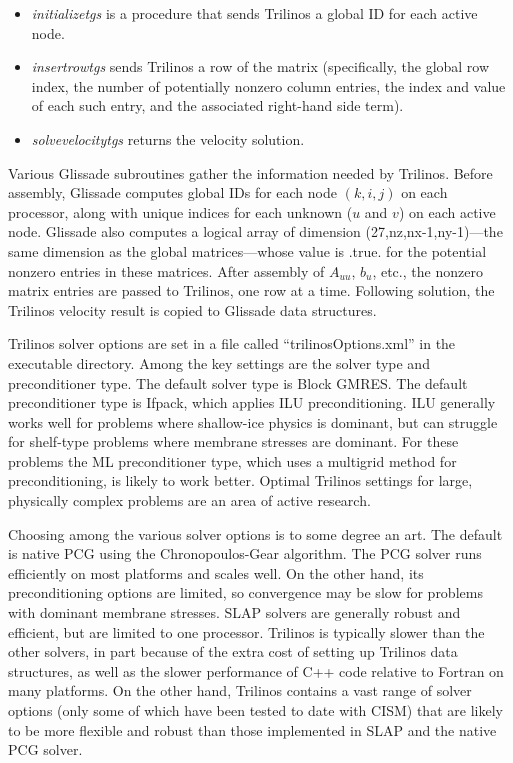 \begin{itemize}
\item \textit{initializetgs} is a procedure that sends Trilinos a global ID for each active node.
\item \textit{insertrowtgs} sends Trilinos a row of the matrix (specifically, the global row index, the number of
potentially nonzero column entries, the index and value of each such entry, and the associated right-hand side term).
\item \textit{solvevelocitytgs} returns the velocity solution.
\end{itemize}

Various Glissade subroutines gather the information needed by Trilinos.  Before assembly, Glissade computes
global IDs for each node $(k,i,j)$ on each processor, along with unique indices for each unknown ($u$ and $v$)
on each active node.  Glissade also computes a logical array of dimension (27,nz,nx-1,ny-1)---the same dimension
as the global matrices---whose value is .true. for the potential nonzero entries in these matrices.
After assembly of $A_{uu}$, $b_u$, etc., the nonzero matrix entries are passed to Trilinos, one row at a time.
Following solution, the Trilinos velocity result is copied to Glissade data structures.

Trilinos solver options are set in a file called ``trilinosOptions.xml'' in the executable directory.
Among the key settings are the solver type and preconditioner type.  The default solver type is Block GMRES.
The default preconditioner type is Ifpack, which applies ILU preconditioning.  ILU generally works well
for problems where shallow-ice physics is dominant, but can struggle for shelf-type problems where
membrane stresses are dominant.  For these problems the ML preconditioner type, which uses a multigrid
method for preconditioning, is likely to work better.  Optimal Trilinos settings for large, physically complex
problems are an area of active research.

Choosing among the various solver options is to some degree an art.  The default is native PCG using
the Chronopoulos-Gear algorithm.  The PCG solver runs efficiently on most platforms and scales well.
On the other hand, its preconditioning options are limited, so convergence may be slow for problems
with dominant membrane stresses.  SLAP solvers are generally robust and efficient, but are limited
to one processor.  Trilinos is typically slower than the other solvers, in part because of the
extra cost of setting up Trilinos data structures, as well as the slower performance of C++ code
relative to Fortran on many platforms.  On the other hand, Trilinos contains a vast range of
solver options (only some of which have been tested to date with CISM) that are likely to 
be more flexible and robust than those implemented in SLAP and the native PCG solver.


